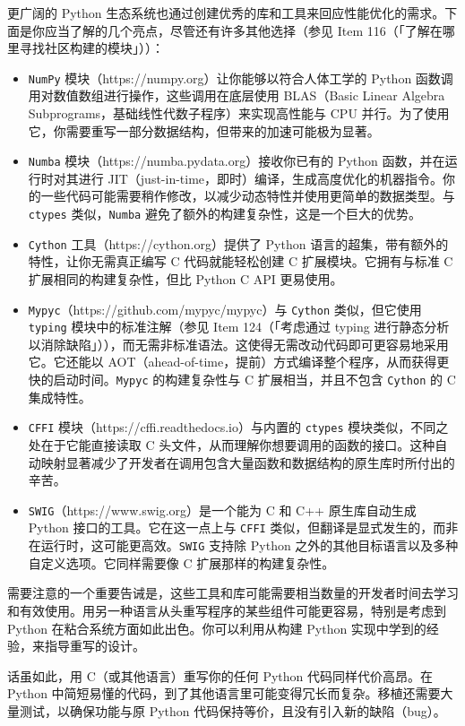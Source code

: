 更广阔的 Python 生态系统也通过创建优秀的库和工具来回应性能优化的需求。下面是你应当了解的几个亮点，尽管还有许多其他选择（参见 Item 116（「了解在哪里寻找社区构建的模块」））：

\begin{itemize}
\item \texttt{NumPy} 模块（https://numpy.org）让你能够以符合人体工学的 Python 函数调用对数值数组进行操作，这些调用在底层使用 BLAS（Basic Linear Algebra Subprograms，基础线性代数子程序）来实现高性能与 CPU 并行。为了使用它，你需要重写一部分数据结构，但带来的加速可能极为显著。
\item \texttt{Numba} 模块（https://numba.pydata.org）接收你已有的 Python 函数，并在运行时对其进行 JIT（just-in-time，即时）编译，生成高度优化的机器指令。你的一些代码可能需要稍作修改，以减少动态特性并使用更简单的数据类型。与 \texttt{ctypes} 类似，\texttt{Numba} 避免了额外的构建复杂性，这是一个巨大的优势。
\item \texttt{Cython} 工具（https://cython.org）提供了 Python 语言的超集，带有额外的特性，让你无需真正编写 C 代码就能轻松创建 C 扩展模块。它拥有与标准 C 扩展相同的构建复杂性，但比 Python C API 更易使用。
\item \texttt{Mypyc}（https://github.com/mypyc/mypyc）与 \texttt{Cython} 类似，但它使用 \texttt{typing} 模块中的标准注解（参见 Item 124（「考虑通过 typing 进行静态分析以消除缺陷」）），而无需非标准语法。这使得无需改动代码即可更容易地采用它。它还能以 AOT（ahead-of-time，提前）方式编译整个程序，从而获得更快的启动时间。\texttt{Mypyc} 的构建复杂性与 C 扩展相当，并且不包含 \texttt{Cython} 的 C 集成特性。
\item \texttt{CFFI} 模块（https://cffi.readthedocs.io）与内置的 \texttt{ctypes} 模块类似，不同之处在于它能直接读取 C 头文件，从而理解你想要调用的函数的接口。这种自动映射显著减少了开发者在调用包含大量函数和数据结构的原生库时所付出的辛苦。
\item \texttt{SWIG}（https://www.swig.org）是一个能为 C 和 C++ 原生库自动生成 Python 接口的工具。它在这一点上与 \texttt{CFFI} 类似，但翻译是显式发生的，而非在运行时，这可能更高效。\texttt{SWIG} 支持除 Python 之外的其他目标语言以及多种自定义选项。它同样需要像 C 扩展那样的构建复杂性。
\end{itemize}

需要注意的一个重要告诫是，这些工具和库可能需要相当数量的开发者时间去学习和有效使用。用另一种语言从头重写程序的某些组件可能更容易，特别是考虑到 Python 在粘合系统方面如此出色。你可以利用从构建 Python 实现中学到的经验，来指导重写的设计。

话虽如此，用 C（或其他语言）重写你的任何 Python 代码同样代价高昂。在 Python 中简短易懂的代码，到了其他语言里可能变得冗长而复杂。移植还需要大量测试，以确保功能与原 Python 代码保持等价，且没有引入新的缺陷（bug）。

